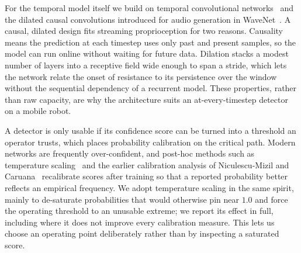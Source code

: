 For the temporal model itself we build on temporal convolutional networks~\cite{bai2018tcn} and the dilated causal convolutions introduced for audio generation in WaveNet~\cite{oord2016wavenet}. A causal, dilated design fits streaming proprioception for two reasons. Causality means the prediction at each timestep uses only past and present samples, so the model can run online without waiting for future data. Dilation stacks a modest number of layers into a receptive field wide enough to span a stride, which lets the network relate the onset of resistance to its persistence over the window without the sequential dependency of a recurrent model. These properties, rather than raw capacity, are why the architecture suits an at-every-timestep detector on a mobile robot.

A detector is only usable if its confidence score can be turned into a threshold an operator trusts, which places probability calibration on the critical path. Modern networks are frequently over-confident, and post-hoc methods such as temperature scaling~\cite{guo2017calibration} and the earlier calibration analysis of Niculescu-Mizil and Caruana~\cite{niculescu2005predicting} recalibrate scores after training so that a reported probability better reflects an empirical frequency. We adopt temperature scaling in the same spirit, mainly to de-saturate probabilities that would otherwise pin near $1.0$ and force the operating threshold to an unusable extreme; we report its effect in full, including where it does not improve every calibration measure. This lets us choose an operating point deliberately rather than by inspecting a saturated score.